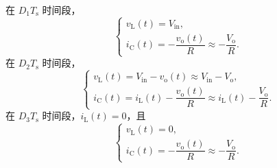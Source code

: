 \documentclass[
  12pt,
  UTF8,
  a4paper,
  fontset=fandol,
  oneside,
  openany
]{ctexrep}
\begin{document}
在 $D_1T_{\mathrm{s}}$ 时间段，
\begin{equation}
  \begin{cases}
    v_{\mathrm{L}}(t)=V_{\mathrm{in}}, \\
    i_{\mathrm{C}}(t)=-\dfrac{v_{\mathrm{o}}(t)}{R}\approx-\dfrac{V_{\mathrm{o}}}{R}.
  \end{cases}
  \label{equ0424}
\end{equation}
在 $D_2T_{\mathrm{s}}$ 时间段，
\begin{equation}
  \begin{cases}
    v_{\mathrm{L}}(t)=V_{\mathrm{in}}-v_{\mathrm{o}}(t)\approx V_{\mathrm{in}}-V_{\mathrm{o}}, \\
    i_{\mathrm{C}}(t)=i_{\mathrm{L}}(t)-\dfrac{v_{\mathrm{o}}(t)}{R}
    \approx i_{\mathrm{L}}(t)-\dfrac{V_{\mathrm{o}}}{R}.
  \end{cases}
  \label{equ0425}
\end{equation}
在 $D_3T_{\mathrm{s}}$ 时间段，$i_{\mathrm{L}}(t)=0$，且
\begin{equation}
  \begin{cases}
    v_{\mathrm{L}}(t)=0, \\
    i_{\mathrm{C}}(t)=-\dfrac{v_{\mathrm{o}}(t)}{R}\approx-\dfrac{V_{\mathrm{o}}}{R}.
  \end{cases}
  \label{equ0426}
\end{equation}
\end{document}
